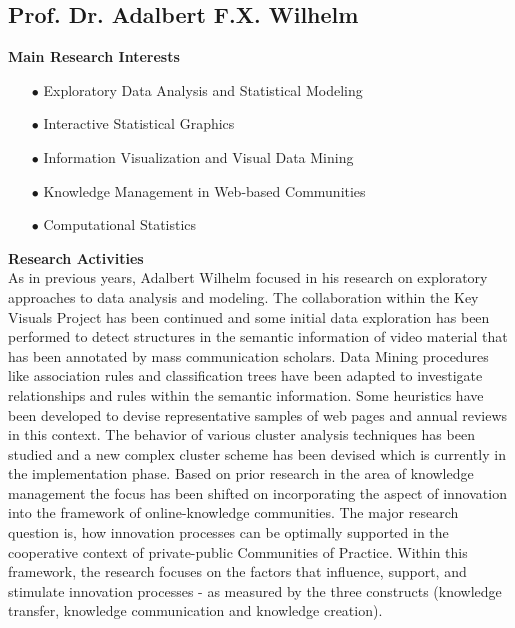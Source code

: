 \subsection{Prof. Dr. Adalbert F.X. Wilhelm}


\textbf{Main Research Interests}\\[-0.25cm]
\begin{enumerate}
\item[$\bullet$]	Exploratory Data Analysis and Statistical Modeling
\item[$\bullet$]	Interactive Statistical Graphics
\item[$\bullet$]	Information Visualization and Visual Data Mining
\item[$\bullet$]	Knowledge Management in Web-based Communities
\item[$\bullet$]	Computational Statistics
\end{enumerate}

\vspace{0.6cm}
\textbf{Research Activities}\\[-0.25cm]

As in previous years, Adalbert Wilhelm focused in his research on exploratory approaches to data analysis and modeling. The collaboration within the Key Visuals Project has been continued and some initial data exploration has been performed to detect structures in the semantic information of video material that has been annotated by mass communication scholars. Data Mining procedures like association rules and classification trees have been adapted to investigate relationships and rules within the semantic information. Some heuristics have been developed to devise representative samples of web pages and annual reviews in this context. The behavior of various cluster analysis techniques has been studied and a new complex cluster scheme has been devised which is currently in the implementation phase. Based on prior research in the area of knowledge management the focus has been shifted on incorporating the aspect of innovation into the framework of online-knowledge communities. The major research question is, how innovation processes can be optimally supported in the cooperative context of private-public Communities of Practice. Within this framework, the research focuses on the factors that influence, support, and stimulate innovation processes - as measured by the three constructs (knowledge transfer, knowledge communication and knowledge creation).


